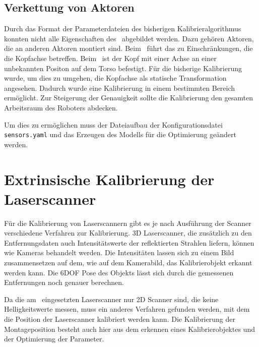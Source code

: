 \subsection{Verkettung von Aktoren}
\label{sub:Verkettung von Aktoren}

Durch das Format der Parameterdateien des bisherigen Kalibrieralgorithmus konnten
nicht alle Eigenschaften des \cob\ abgebildet werden. Dazu gehören Aktoren, die
an anderen Aktoren montiert sind. Beim \cob\ führt das zu Einschränkungen, die 
die Kopfachse betreffen. Beim \cob\ ist der Kopf mit einer Achse an einer 
unbekannten Positon auf dem Torso befestigt. Für die bisherige Kalibrierung wurde,
um dies zu umgehen, die Kopfachse als statische Transformation angesehen. Dadurch
wurde eine Kalibrierung in einem bestimmten Bereich ermöglicht. Zur Steigerung
der Genauigkeit sollte die Kalibrierung den gesamten Arbeitsraum des Roboters
abdecken. 

Um dies zu ermöglichen muss der Dateiaufbau der Konfigurationsdatei 
\texttt{sensors.yaml} und das Erzeugen des Modells für die Optimierung geändert
werden.


\section{Extrinsische Kalibrierung der Laserscanner}
\label{sec:extr Kalibrierung der Laserscanner}


Für die Kalibrierung von Laserscannern gibt es je nach Ausführung der Scanner
verschiedene Verfahren zur Kalibrierung. 3D Laserscanner, die zusätzlich zu den
Entfernungsdaten auch Intensitätswerte der reflektierten Strahlen liefern,
können wie Kameras behandelt werden. Die Intensitäten lassen sich zu einem Bild
zusammensetzen auf dem, wie auf dem Kamerabild, das Kalibrierobjekt erkannt
werden kann. Die 6\ac{DOF} Pose des Objekts lässt sich durch die gemessenen 
Entfernungen noch genauer berechnen.\cite{Pradeep2010}

Da die am \cob\ eingesetzten Laserscanner nur 2D Scanner sind, die keine 
Helligkeitswerte messen, muss ein anderes Verfahren gefunden werden, mit dem
die Position der Laserscanner kalibriert werden kann.
Die Kalibrierung der Montageposition besteht auch hier aus dem erkennen eines
Kalibrierobjektes und der Optimierung der Parameter. 
